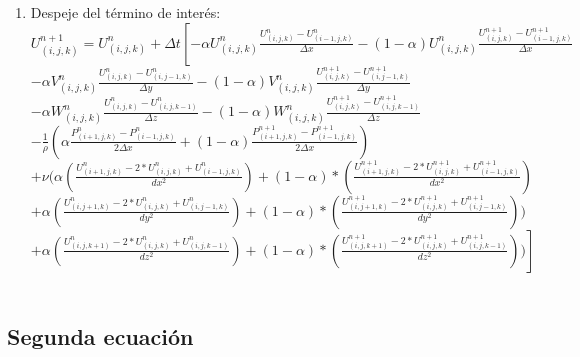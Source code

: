 \documentclass[a4paper]{article}
\begin{document}
\begin{enumerate}
\item Despeje del término de interés:
~\\
$ {U}^{n+1}_{(i,j,k)} = U^{n}_{(i,j,k)} + \Delta t \left[ -  \alpha {U}^{n}_{(i,j,k)} \frac{ {U}^{n}_{(i,j,k)} - U^{n}_{(i-1,j,k)}}{ \Delta x} - (1 - \alpha) {U}^{n}_{(i,j,k)} \frac{ {U}^{n+1}_{(i,j,k)} - U^{n+1}_{(i-1,j,k)}}{ \Delta x} \right.$ 
\\
$- \alpha {V}^{n}_{(i,j,k)} \frac{ {U}^{n}_{(i,j,k)} - U^{n}_{(i,j-1,k)}}{ \Delta y} - (1 - \alpha) {V}^{n}_{(i,j,k)} \frac{ {U}^{n+1}_{(i,j,k)} - U^{n+1}_{(i,j-1,k)}}{ \Delta y}$
\\
$- \alpha {W}^{n}_{(i,j,k)} \frac{ {U}^{n}_{(i,j,k)} - U^{n}_{(i,j,k-1)}}{ \Delta z} - (1 - \alpha) {W}^{n}_{(i,j,k)} \frac{ {U}^{n+1}_{(i,j,k)} - U^{n+1}_{(i,j,k-1)}}{ \Delta z}$
\\
$- \frac{1}{\rho} ( \alpha \frac{P^{n}_{(i+1,j,k)} - P^{n}_{(i-1,j,k)} }{ 2 \Delta x } + (1 - \alpha) \frac{P^{n+1}_{(i+1,j,k)} - P^{n+1}_{(i-1,j,k)} }{ 2 \Delta x })  $
\\
$+ \nu (\alpha (\frac{ U^{n}_{(i+1,j,k)} - 2*U^{n}_{(i,j,k)} + U^{n}_{(i-1,j,k)}}{dx^2}) + (1-\alpha)*(\frac{ U^{n+1}_{(i+1,j,k)} - 2*U^{n+1}_{(i,j,k)} + U^{n+1}_{(i-1,j,k)}}{dx^2})$
\\
$+ \alpha (\frac{ U^{n}_{(i,j+1,k)} - 2*U^{n}_{(i,j,k)} + U^{n}_{(i,j-1,k)}}{dy^2}) + (1-\alpha)*(\frac{ U^{n+1}_{(i,j+1,k)} - 2*U^{n+1}_{(i,j,k)} + U^{n+1}_{(i,j-1,k)}}{dy^2}))$
\\
$ \left.+ \alpha (\frac{ U^{n}_{(i,j,k+1)} - 2*U^{n}_{(i,j,k)} + U^{n}_{(i,j,k-1)}}{dz^2}) + (1-\alpha)*(\frac{ U^{n+1}_{(i,j,k+1)} - 2*U^{n+1}_{(i,j,k)} + U^{n+1}_{(i,j,k-1)}}{dz^2})) \right]$
~\\


\end{enumerate}



\subsection{Segunda ecuación}
\end{document}

